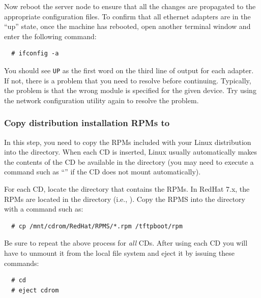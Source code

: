 Now reboot the server node to ensure that all the changes are
propagated to the appropriate configuration files.  To confirm that
all ethernet adapters are in the ``up'' state, once the machine has
rebooted, open another terminal window and enter the following
command:

\begin{verbatim}
  # ifconfig -a
\end{verbatim}
  
You should see {\tt UP} as the first word on the third line of output
for each adapter. If not, there is a problem that you need to resolve
before continuing. Typically, the problem is that the wrong module is
specified for the given device. Try using the network configuration
utility again to resolve the problem.
  

\subsubsection{Copy distribution installation RPMs to }
\label{det:rpmcopy}

In this step, you need to copy the RPMs included with your Linux
distribution into the  directory.  When each CD is
inserted, Linux usually automatically makes the contents of the CD be
available in the  directory (you may need to execute
a command such as ``'' if the CD does not mount
automatically).

For each CD, locate the directory that contains the RPMs.  In RedHat
7.x, the RPMs are located in the  directory (i.e.,
).  Copy the RPMS into the
 directory with a command such as:

\begin{verbatim}
  # cp /mnt/cdrom/RedHat/RPMS/*.rpm /tftpboot/rpm
\end{verbatim}
  
Be sure to repeat the above process for {\em all} CDs.  After using
each CD you will have to unmount it from the local file system and
eject it by issuing these commands:

\begin{verbatim}
  # cd
  # eject cdrom
\end{verbatim}


